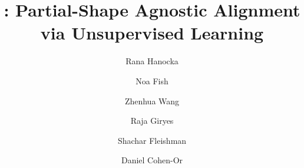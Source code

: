 \documentclass[acmtog,timestamp]{acmart}%
\begin{document}
\title{: Partial-Shape Agnostic Alignment via Unsupervised Learning}


\author{Rana Hanocka}

\author{Noa Fish}

\author{Zhenhua Wang}

\author{Raja Giryes}

\author{Shachar Fleishman}


\author{Daniel Cohen-Or}
\end{document}
